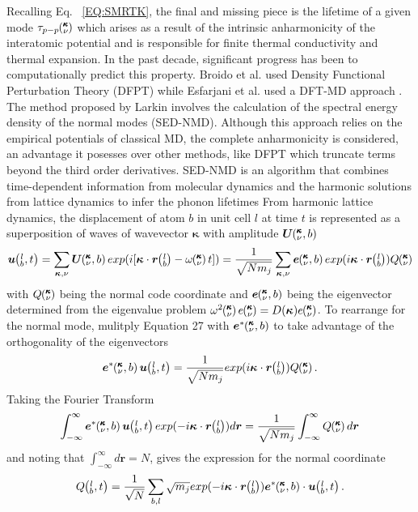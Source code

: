 Recalling Eq. ~\ref{EQ:SMRTK}, the final and missing piece is the lifetime of a given mode $\tau_{p-p}\mspace{-4.0mu}\left(\mspace{-8.0mu} \begin{smallmatrix}&\pmb{\kappa} \\&\nu\end{smallmatrix} \mspace{-3.0mu}\right)$ which arises as a result of the intrinsic anharmonicity of the interatomic potential and is responsible for finite thermal conductivity and thermal expansion. In the past decade, significant progress has been to computationally predict this property. Broido et al. used Density Functional Perturbation Theory (DFPT) \cite{Broido1} while Esfarjani et al. used a DFT-MD approach \cite{PhysRevB.84.085204}. The method proposed by Larkin \cite{jason_inpress} involves the calculation of the spectral energy density of the normal modes (SED-NMD). Although this approach relies on the empirical potentials of classical MD, the complete anharmonicity is considered, an advantage it posesses over other methods, like DFPT which truncate terms beyond the third order derivatives. SED-NMD is an algorithm that combines time-dependent information from molecular dynamics and the harmonic solutions from lattice dynamics to infer the phonon lifetimes From harmonic lattice dynamics, the displacement of atom $b$ in unit cell $l$ at time $t$ is represented as a superposition of waves of wavevector $\bm{\kappa}$ with amplitude $\bm{U}\mspace{-4.0mu}\left(\mspace{-8.0mu} \begin{smallmatrix} &\pmb{\kappa} \\ &\nu \end{smallmatrix} \mspace{-2.0mu},b\right)$
%
\begin{equation}
\bm{u}\lbt=\sum_{\bm{\kappa},\nu}\bm{U}\kvb exp(i[\bm{\kappa}\cdot\bm{r}\lb-\omega\kv t])=\frac{1}{\sqrt{Nm_j}}\sum_{\bm{\kappa},\nu}\bm{e}\kvb exp(i\bm{\kappa}\cdot\bm{r}\lb)Q\kv
\end{equation}
%
with $Q\mspace{-4.0mu}\left(\mspace{-8.0mu} \begin{smallmatrix}&\pmb{\kappa} \\&\nu\end{smallmatrix} \mspace{-3.0mu}\right)$ being the normal code coordinate and $\bm{e}\mspace{-4.0mu}\left(\mspace{-8.0mu} \begin{smallmatrix} &\pmb{\kappa} \\ &\nu \end{smallmatrix} \mspace{-2.0mu},b\right)$ being the eigenvector determined from the eigenvalue problem $\omega^2\kv e\kv=D(\bm{\kappa})e\kv$. To rearrange for the normal mode, mulitply Equation 27 with $\bm{e}^*\mspace{-4.0mu}\left(\mspace{-8.0mu} \begin{smallmatrix} &\pmb{\kappa} \\ &\nu \end{smallmatrix} \mspace{-2.0mu},b\right)$ to take advantage of the orthogonality of the eigenvectors
%
\begin{equation}
\bm{e}^*\kvb\bm{u}\lbt=\frac{1}{\sqrt{Nm_j}}exp(i\bm{\kappa}\cdot\bm{r}\lb)Q\kv.
\end{equation}
%
Taking the Fourier Transform
%
\begin{equation}
\int_{-\infty}^{\infty}\bm{e}^*\kvb\bm{u}\lbt exp(-i\bm{\kappa}\cdot\bm{r}\lb)d\bm{r}=\frac{1}{\sqrt{Nm_j}}\int_{-\infty}^{\infty}Q\kv d\bm{r}
\end{equation}
%
and noting that $\int_{-\infty}^{\infty}d\bm{r}=N$, gives the expression for the normal coordinate
%
\begin{equation}
Q\lbt=\frac{1}{\sqrt{N}}\sum_{b,l}\sqrt{m_j}exp(-i\bm{\kappa}\cdot\bm{r}\lb)\bm{e}^*\kvb\cdot\bm{u}\lbt.
\end{equation}
